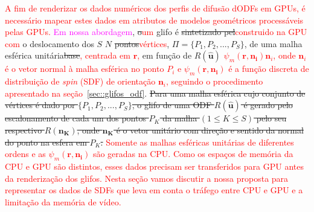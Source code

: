 \textcolor{red}{A fim de renderizar os dados numéricos dos perfis de difusão dODFs em GPUs, é necessário mapear estes dados em atributos de modelos geométricos processáveis pelas GPUs.} \textcolor{magenta}{Em nossa abordagem}, \sout{o}\textcolor{red}{um} glifo é \sout{sintetizado pel}\textcolor{red}{construido na GPU com }o deslocamento dos $S$ \sout{$N$} \sout{pontos}\textcolor{red}{vértices},  $\Pi = \{
P_1,
P_2, ...,
P_S
\}$,
de uma malha esférica unitária\sout{base}\textcolor{red}{, centrada em $\mathbf{r}$,} em função de \sout{$R(\mathbf{\hat{u}})$} \textcolor{red}{$\psi_m (\mathbf{r, \mathbf{n}_i}) \mathbf{n}_i$, onde $\mathbf{n}_i$ é o vetor normal à malha esférica no ponto $P_i$ e $\psi_m (\mathbf{r, \mathbf{n}_i})$ é a função discreta de distribuição de \textit{spin} (SDF) de orientação $\mathbf{n}_i$, seguindo o procedimento apresentado na seção~\ref{sec::glifos_odf}}. \sout{Para uma malha esférica cujo conjunto de vértices é dado por $\{
P_1,
P_2, ...,
P_S
\}$, o glifo de uma ODF $R(\mathbf{\hat{u}})$ é gerado pelo escalonamento de cada um dos pontos $P_K$ da malha $(1 \leq K \leq S)$ pelo seu respectivo $R(\mathbf{n_K})$, onde $\mathbf{n_K}$ é o vetor unitário com direção e sentido da normal do ponto na esfera em $P_K$.} \textcolor{red}{Somente as malhas esféricas unitárias de diferentes ordens e as $\psi_m (\mathbf{r, \mathbf{n}_i})$ são geradas na CPU. Como os espaços de memória da CPU e GPU são distintos, esses dados precisam ser transferidos para GPU antes da renderização dos glifos. Nesta seção vamos discutir a nossa proposta para representar os dados de SDFs que leva em conta o tráfego entre CPU e GPU e a limitação da memória de vídeo.}



